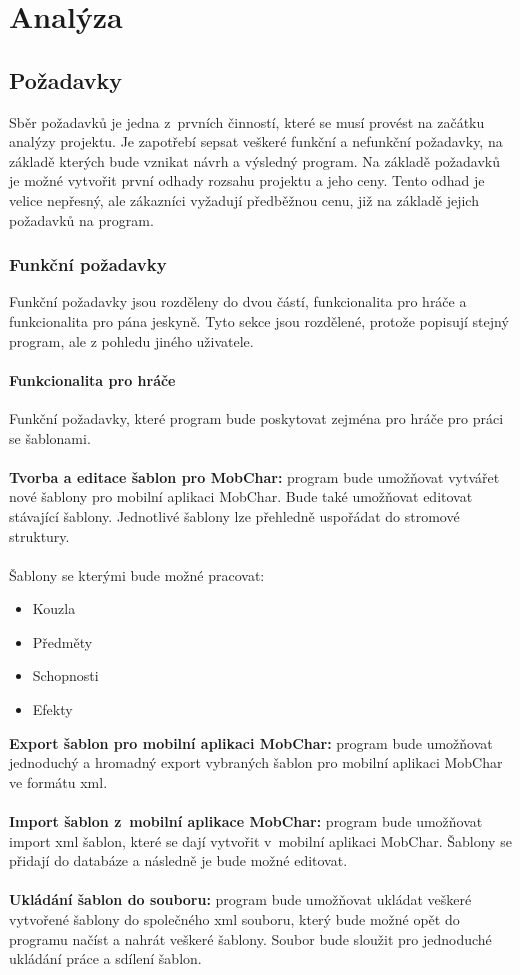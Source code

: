 \documentclass[thesis=B,czech]{resources/FITthesis}[2012/06/26]
\begin{document}
\chapter{Analýza}
	\section{Požadavky}

Sběr požadavků je jedna z~prvních činností, které se musí provést na začátku analýzy projektu. Je zapotřebí sepsat veškeré funkční a nefunkční požadavky, na základě kterých bude vznikat návrh a výsledný program. Na základě požadavků je možné vytvořit první odhady rozsahu projektu a jeho ceny. Tento odhad je velice nepřesný, ale zákazníci vyžadují předběžnou cenu, již na základě jejich požadavků na program. 
	
\subsection{Funkční požadavky}
Funkční požadavky jsou rozděleny do dvou částí, funkcionalita pro hráče a funkcionalita pro pána jeskyně. Tyto sekce jsou rozdělené, protože popisují stejný program, ale z pohledu jiného uživatele.
\subsubsection{Funkcionalita pro hráče}
Funkční požadavky, které program bude poskytovat zejména pro hráče pro práci se šablonami.\\
\\
\textbf{Tvorba a editace šablon pro MobChar:} program bude umožňovat vytvářet nové šablony pro mobilní aplikaci MobChar. Bude také umožňovat editovat stávající šablony. Jednotlivé šablony lze přehledně uspořádat do stromové struktury.\\
\\
Šablony se kterými bude možné pracovat:
				\begin{itemize}
					\item Kouzla
					\item Předměty
					\item Schopnosti
					\item Efekty
				\end{itemize}
\textbf{Export šablon pro mobilní aplikaci MobChar:} program bude umožňovat jednoduchý a hromadný export vybraných šablon pro mobilní aplikaci MobChar ve formátu xml.\\
\\
\textbf{Import šablon z~mobilní aplikace MobChar:} program bude umožňovat import xml šablon, které se dají vytvořit v~mobilní aplikaci MobChar. Šablony se přidají do databáze a následně je bude možné editovat.\\
\\
\textbf{Ukládání šablon do souboru:} program bude umožňovat ukládat veškeré vytvořené šablony do společného xml souboru, který bude možné opět do programu načíst a nahrát veškeré šablony. Soubor bude sloužit pro jednoduché ukládání práce a sdílení šablon.
\end{document}
